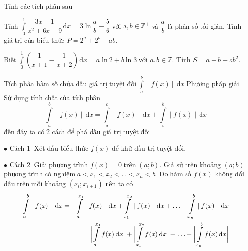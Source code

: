 \begin{bt}%
	Tính các tích phân sau
	\begin{enumEX}{1}
		\item Tính $ \displaystyle\int\limits_0^1 	\dfrac{3x-1}{x^2+6x+9}\mathrm{\,d}x=3\ln \dfrac{a}{b}-\dfrac{5}{6} $ với $ a, b \in \mathbb{Z^+} $ và $\dfrac{a}{b} $ là phân số tối giản. Tính giá trị của biểu thức $ P=2^a+2^b-ab $.
		\item Biết $ \displaystyle\int\limits_0^1 \left(\dfrac{1}{x+1}-\dfrac{1}{x+2}\right)\mathrm{\,d}x=a\ln 2+b\ln 3 $ với $ a, b \in \mathbb{Z}$. Tính $ S=a+b-ab^2 $.
\end{enumEX}
\end{bt}
\begin{dang}{Tích phân hàm số chứa dấu giá trị tuyệt đối $\displaystyle\int\limits_{a}^{b} \mid f(x) \mid \mathrm{\,d}x$}
	Phương pháp giải\\
	Sử dụng tính chất của tích phân \\
	\begin{displaymath}
		\int\limits_{a}^{b} \mid f(x)\mid  \mathrm{\,d}x=\int\limits_{a}^{c} \mid f(x)\mid  \mathrm{\,d}x+\int\limits_{c}^{b} \mid f(x)\mid  \mathrm{\,d}x
	\end{displaymath}
	đến đây ta có 2 cách để phá dấu giá trị tuyệt đối
	\begin{listEX}
		\item [$\bullet$] Cách 1. Xét dấu biểu thức $f(x)$ để khử dấu trị tuyệt đối.
		\item [$\bullet$] Cách 2. Giải phương trình $f(x)=0$ trên  $\left(a;b\right)$. Giả sử trên khoảng $\left(a;b\right)$ phương trình có nghiệm $a<x_1<x_2<\ldots <x_n<b$. Do hàm số $f(x)$ không đổi dấu trên mỗi khoảng $\left(x_i;x_{i+1}\right)$ nên ta có
		\begin{eqnarray*}
			\int\limits_{a}^{b} \mid f(x)\mid  \mathrm{\,d}x&=&\int\limits_{a}^{x_1} \mid f(x)\mid  \mathrm{\,d}x+\int\limits_{x_1}^{x_2} \mid f(x)\mid  \mathrm{\,d}x+\ldots +\int\limits_{x_n}^{b} \mid f(x)\mid  \mathrm{\,d}x\\
			&=&\bigg{|} \int\limits_{a}^{x_1}  f(x) \mathrm{\,d}x\bigg{|}+\bigg{|} \int\limits_{x_1}^{x_2}  f(x) \mathrm{\,d}x\bigg{|}+\ldots +\bigg{|} \int\limits_{x_n}^{b}  f(x) \mathrm{\,d}x\bigg{|}
		\end{eqnarray*}
	\end{listEX}
\end{dang}
